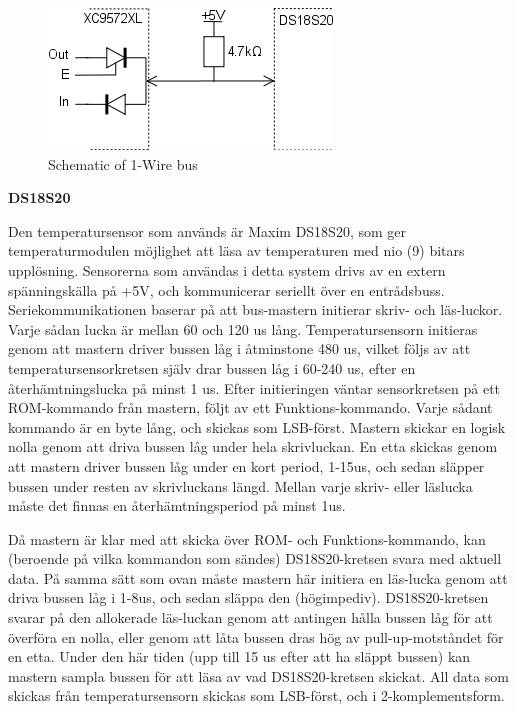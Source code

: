 \documentclass[a4paper,11pt]{article}
\begin{document}
	\begin{figure}[h!tb]
	  \centering
	      \includegraphics[scale=0.5, angle=0]{TempBus.png}
	  	\caption{Schematic of 1-Wire bus}
	\end{figure}

{\noindent \bf DS18S20}

Den temperatursensor som används är Maxim DS18S20, som ger temperaturmodulen möjlighet att läsa av temperaturen
med nio (9) bitars upplösning. Sensorerna som användas i detta system drivs av en extern spänningskälla på +5V,
och kommunicerar seriellt över en entrådsbuss. Seriekommunikationen baserar på att bus-mastern initierar skriv-
och läs-luckor. Varje sådan lucka är mellan 60 och 120 us lång. Temperatursensorn initieras genom att mastern
driver bussen låg i åtminstone 480 us, vilket följs av att temperatursensorkretsen själv drar bussen låg i 60-240 us,
efter en återhämtningslucka på minst 1 us. Efter initieringen väntar sensorkretsen på ett ROM-kommando från mastern,
följt av ett Funktions-kommando. Varje sådant kommando är en byte lång, och skickas som LSB-först. Mastern skickar
en logisk nolla genom att driva bussen låg under hela skrivluckan. En etta skickas genom att mastern driver bussen låg
under en kort period, 1-15us, och sedan släpper bussen under resten av skrivluckans längd. Mellan varje skriv- eller läslucka
måste det finnas en återhämtningsperiod på minst 1us.

Då mastern är klar med att skicka över ROM- och Funktions-kommando, kan (beroende på vilka kommandon som sändes) DS18S20-kretsen
svara med aktuell data. På samma sätt som ovan måste mastern här initiera en läs-lucka genom att driva bussen låg i 1-8us, och
sedan släppa den (högimpediv). DS18S20-kretsen svarar på den allokerade läs-luckan genom att antingen hålla bussen låg för att
överföra en nolla, eller genom att låta bussen dras hög av pull-up-motståndet för en etta. Under den här tiden (upp till 15 us
efter att ha släppt bussen) kan mastern sampla bussen för att läsa av vad DS18S20-kretsen skickat. All data som skickas från
temperatursensorn skickas som LSB-först, och i 2-komplementsform.\\
\end{document}
